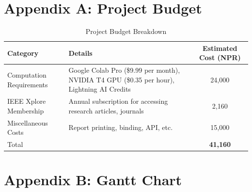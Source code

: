 \section*{Appendix A: Project Budget}

\begin{table}[H]
    \centering
    \small
    \caption{Project Budget Breakdown}
    \begin{tabular}{p{3.5cm}p{5.5cm}c}
        \toprule
        \textbf{Category} & \textbf{Details} & \textbf{Estimated Cost (NPR)} \\
        \midrule
        Computation Requirements & Google Colab Pro (\$9.99 per month), NVIDIA T4 GPU (\$0.35 per hour), Lightning AI Credits & 24,000 \\
        IEEE Xplore Membership & Annual subscription for accessing research articles, journals & 2,160 \\
        Miscellaneous Costs & Report printing, binding, API, etc. & 15,000 \\
        \midrule
        Total & & \textbf{41,160} \\
        \bottomrule
    \end{tabular}
    \label{tab:project_budget}
\end{table}

\clearpage
\section*{Appendix B: Gantt Chart}

